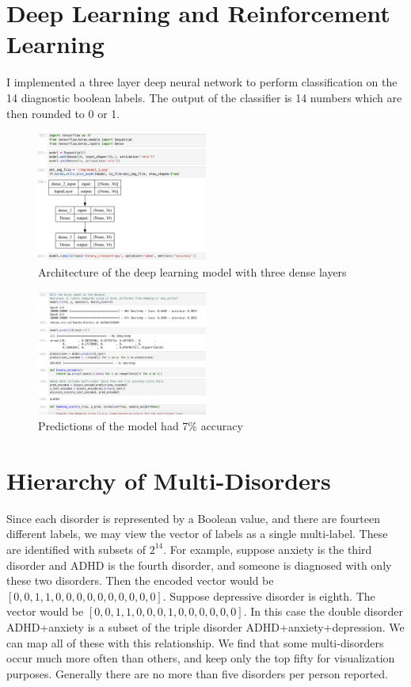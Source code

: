 \documentclass[11pt]{amsart}
\begin{document}
\section{Deep Learning and Reinforcement Learning}

I implemented a three layer deep neural network to perform classification on the 14 diagnostic boolean labels. The output of the classifier is 14 numbers which are then rounded to 0 or 1.

\begin{figure}[h]
\caption{Architecture of the deep learning model with three dense layers}
\centering
\includegraphics[width=0.5\textwidth]{model_architecture.png}
\end{figure}

\begin{figure}[h]
\caption{Predictions of the model had 7\% accuracy}
\centering
\includegraphics[width=0.5\textwidth]{model_predictions.png}
\end{figure}

\section{Hierarchy of Multi-Disorders}

Since each disorder is represented by a Boolean value, and there are fourteen different labels, we may view the vector of labels as a single multi-label. These are identified with subsets of $2^14$. For example, suppose anxiety is the third disorder and ADHD is the fourth disorder, and someone is diagnosed with only these two disorders. Then the encoded vector would be $\left[0,0,1,1,0,0,0,0,0,0,0,0,0,0\right]$. Suppose depressive disorder is eighth. The vector would be $\left[0,0,1,1,0,0,0,1,0,0,0,0,0,0\right]$. In this case the double disorder ADHD+anxiety is a subset of the triple disorder ADHD+anxiety+depression. We can map all of these with this relationship. We find that some multi-disorders occur much more often than others, and keep only the top fifty for visualization purposes. Generally there are no more than five disorders per person reported. \\
\end{document}
